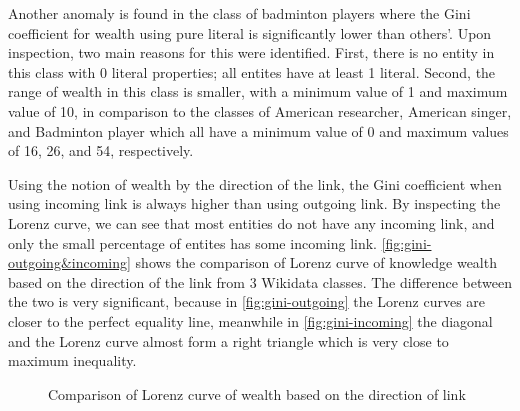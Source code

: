 Another anomaly is found in the class of badminton players where the Gini coefficient for wealth using pure literal is significantly lower than others'. Upon inspection, two main reasons for this were identified. First, there is no entity in this class with 0 literal properties; all entites have at least 1 literal. Second, the range of wealth in this class is smaller, with a minimum value of 1 and maximum value of 10, in comparison to the classes of American researcher, American singer, and Badminton player which all have a minimum value of 0 and maximum values of 16, 26, and 54, respectively.


Using the notion of wealth by the direction of the link, the Gini coefficient when using incoming link is always higher than using outgoing link. By inspecting the Lorenz curve, we can see that most entities do not have any incoming link, and only the small percentage of entites has some incoming link. \autoref{fig:gini-outgoing&incoming} shows the comparison of Lorenz curve of knowledge wealth based on the direction of the link from 3 Wikidata classes. The difference between the two is very significant, because in \autoref{fig:gini-outgoing} the Lorenz curves are closer to the perfect equality line, meanwhile in \autoref{fig:gini-incoming} the diagonal and the Lorenz curve almost form a right triangle which is very close to maximum inequality.


\begin{figure}[!htbp]
    \centering 
    
    
    \caption{Comparison of Lorenz curve of wealth based on the direction of link} \label{fig:gini-outgoing&incoming}
    
\end{figure}